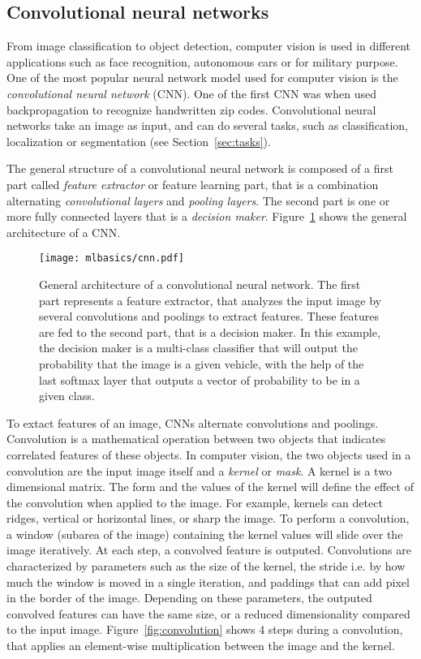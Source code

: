 \subsection{Convolutional neural networks}
From image classification to object detection, computer vision is used in different applications such as face recognition, autonomous cars or for military purpose. One of the most popular neural network model used for computer vision is the \emph{convolutional neural network} (CNN). One of the first CNN was when \citet{lecun_backpropagation_1989} used backpropagation to recognize handwritten zip codes. Convolutional neural networks take an image as input, and can do several tasks, such as classification, localization or segmentation (see Section~\ref{sec:tasks}).

The general structure of a convolutional neural network is composed of a first part called \emph{feature extractor} or feature learning part, that is a combination alternating \emph{convolutional layers} and \emph{pooling layers}. The second part is one or more fully connected layers that is a \emph{decision maker}. Figure~\ref{fig:cnn} shows the general architecture of a CNN.

\begin{figure}[t]
  \centering
  \texttt{[image: mlbasics/cnn.pdf]}
  \caption[Architecture of a convolutional neural network]{General architecture of a convolutional neural network. The first part represents a feature extractor, that analyzes the input image by several convolutions and poolings to extract features. These features are fed to the second part, that is a decision maker. In this example, the decision maker is a multi-class classifier that will output the probability that the image is a given vehicle, with the help of the last softmax layer that outputs a vector of probability to be in a given class.}
  \label{fig:cnn}
\end{figure}

To extact features of an image, CNNs alternate convolutions and poolings. Convolution is a mathematical operation between two objects that indicates correlated features of these objects. In computer vision, the two objects used in a convolution are the input image itself and a \emph{kernel} or \emph{mask}. A kernel is a two dimensional matrix. The form and the values of the kernel will define the effect of the convolution when applied to the image. For example, kernels can detect ridges, vertical or horizontal lines, or sharp the image. To perform a convolution, a window (subarea of the image) containing the kernel values will slide over the image iteratively. At each step, a convolved feature is outputed. Convolutions are characterized by parameters such as the size of the kernel, the stride i.e. by how much the window is moved in a single iteration, and paddings that can add pixel in the border of the image. Depending on these parameters, the outputed convolved features can have the same size, or a reduced dimensionality compared to the input image. Figure~\ref{fig:convolution} shows 4 steps during a convolution, that applies an element-wise multiplication between the image and the kernel.

